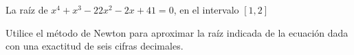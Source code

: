 \item La raíz de $x^4 + x^3 - 22x^2 - 2x + 41 = 0$, en el intervalo $[1, 2]$
\par
Utilice el método de Newton para aproximar la raíz indicada de la ecuación dada con una exactitud de seis cifras decimales.
